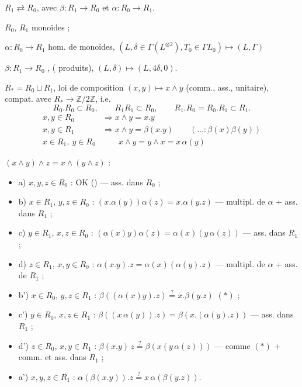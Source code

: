\documentclass[11pt,a4paper]{article}
\begin{document}

$R_1 \rightleftarrows R_0$, avec $\beta : R_1 \to R_0$ et $\alpha : R_0 \to R_1$. 

$R_0$, $R_1$ monoïdes ;

$\alpha : R_0 \to R_1$ hom. de monoïdes, $(L, \delta \in \Gamma(L^{\otimes 2}), T_0 \in \Gamma L_0) \longmapsto (L, \Gamma)$

$\beta : R_1 \to R_0$ , \ill{} ( produits), $(L,\delta) \longmapsto (L, 4\delta, 0)$.

$R_* = R_0 \sqcup R_1$, loi de composition $(x,y) \mapsto x \wedge y$ (comm., ass., unitaire), compat. avec $R_* \to \mathbb{Z}/2\mathbb{Z}$, i.e.
\[
  R_0 . R_0 \subset R_0, \qquad R_1 R_1 \subset R_0, \qquad R_1 . R_0 = R_0 . R_1 \subset R_1 .
\]
\begin{align*}
  x, y \in R_0 &\Longrightarrow x \wedge y = x . y \\
  x, y \in R_1 &\Longrightarrow x \wedge y = \beta(x.y) \qquad (\ldots : \beta(x)\beta(y)) \\
  x \in R_1,\ y \in R_0 &\qquad x \wedge y = y \wedge x = x\, \alpha(y)
\end{align*}

$(x \wedge y) \wedge z = x \wedge (y \wedge z)$ :
\begin{itemize}
  \item a) $x, y, z \in R_0$ : OK (\struck{\ill{}}) — ass. dans $R_0$ ;
  \item b) $x \in R_1$, $y, z \in R_0$ : $(x . \alpha(y))\alpha(z) = x . \alpha(y.z)$ — multipl. de $\alpha$ + ass. dans $R_1$ ;
  \item c) $y \in R_1$, $x, z \in R_0$ : $(\alpha(x) y)\alpha(z) = \alpha(x)(y\,\alpha(z))$ — ass. dans $R_1$ ;
  \item d) $z \in R_1$, $x, y \in R_0$ : $\alpha(x.y).z = \alpha(x)(\alpha(y).z)$ — multipl. de $\alpha$ + ass. de $R_1$ ;
  \item b') $x \in R_0$, $y, z \in R_1$ : $\beta((\alpha(x) y).z) \overset{?}{=} x . \beta(y.z)$ \quad $(*)$ ;
  \item c') $y \in R_0$, $x, z \in R_1$ : $\beta((x\,\alpha(y)).z) = \beta(x.(\alpha(y).z))$ — ass. dans $R_1$ ;
  \item d') $z \in R_0$, $x, y \in R_1$ : $\beta(x.y)\, z \overset{?}{=} \beta(x(y\,\alpha(z)))$ — comme $(*)$ + comm. et ass. dans $R_1$ ;
  \item a') $x, y, z \in R_1$ : $\alpha(\beta(x.y)).z \overset{?}{=} x\, \alpha(\beta(y.z))$.
\end{itemize}
\end{document}
